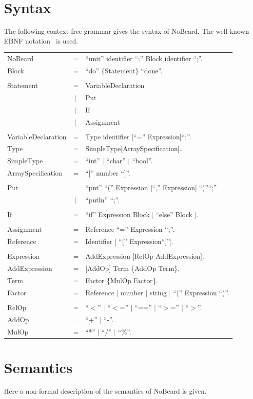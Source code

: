 \documentclass[11pt]{report}
\newcommand{\leongage}{NoBeard}
\newenvironment{grammar}[2]
	{
		\newcommand{\completerule}[2]{##1 & = & ##2.\\}
		\newcommand{\startrule}[2]{##1 & = & ##2\\}
		\newcommand{\alternativerule}[1]{ & $|$ & ##1\\}
		\newcommand{\alternativeend}[1]{ & $|$ & ##1.\\}
		\newcommand{\finishrule}[1]{ & & ##1.\\}
		\begin{tabular}{p{#1} c p{#2}}
	}
	{	\end{tabular}
	}
\begin{document}
\section{Syntax}
The following context free grammar gives the syntax of \leongage{}. The well-known EBNF notation~\cite{wirth_what_1977} is used.

	\begin{grammar}{}{}
		\completerule{NoBeard}{``unit'' identifier ``;'' Block identifier ``;''}

		\completerule{Block}{``do'' \{Statement\} ``done''}

		\\

		\startrule{Statement}{VariableDeclaration}
		\alternativerule{Put}
		\alternativerule{If}
		\alternativerule{Assignment}
		\\
		\completerule{VariableDeclaration}{Type identifier [``='' Expression]``;''}
		\completerule{Type}{SimpleType[ArraySpecification]}
		\completerule{SimpleType}{``int'' $|$ ``char'' $|$ ``bool''}
		\completerule{ArraySpecification}{``['' number ``]''}
		\\
		\startrule{Put}{``put'' ``('' Expression [``,'' Expression] ``)''``;''}
		\alternativeend{``putln'' ``;''}
		\\
		\completerule{If}{``if'' Expression Block [ ``else'' Block ]}
		\\
		\completerule{Assignment}{Reference ``='' Expression ``;''}
		\completerule{Reference}{Identifier [ ``['' Expression``]'']}
		\\
		\completerule{Expression}{AddExpression [RelOp AddExpression]}
		\completerule{AddExpression}{[AddOp] Term \{AddOp Term\}}
		\completerule{Term}{Factor \{MulOp Factor\}}
		\completerule{Factor}{Reference $|$ number $|$ string $|$ ``('' Expression ``)''}
		\\
		\completerule{RelOp}{``$<$'' $|$ ``$<$='' $|$ ``=='' $|$ ``$>$='' $|$ ``$>$''}
		\completerule{AddOp}{``+'' $|$ ``-''}
		\completerule{MulOp}{``*'' $|$ ``/'' $|$ ``\%''}	
	\end{grammar}

\section{Semantics}
Here a non-formal description of the semantics of \leongage{} is given.
\end{document}
